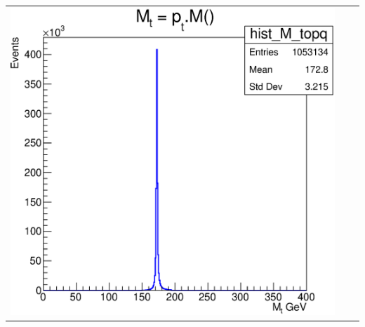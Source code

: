 \documentclass[10pt]{beamer}
\begin{document}
\begin{frame}
\begin{center}
\begin{tabular}{ccc}
	\includegraphics[scale=0.18]{plot-mtop-gen.eps} &


\end{tabular}
\end{center}
\end{frame}
\end{document}
